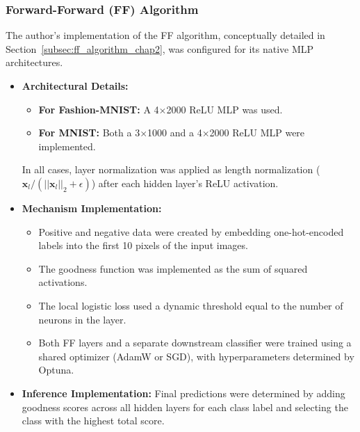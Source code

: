 \subsubsection{Forward-Forward (FF) Algorithm}
\label{subsec:methodology_ff}
The author's implementation of the FF algorithm, conceptually detailed in Section~\ref{subsec:ff_algorithm_chap2}, was configured for its native MLP architectures.
\begin{itemize}
    \item \textbf{Architectural Details:}
        \begin{itemize}
            \item \textbf{For Fashion-MNIST:} A 4$\times$2000 ReLU MLP was used.
            \item \textbf{For MNIST:} Both a 3$\times$1000 and a 4$\times$2000 ReLU MLP were implemented.
        \end{itemize}
        In all cases, layer normalization was applied as length normalization ($ \mathbf{x}_l / (||\mathbf{x}_l||_2 + \epsilon) $) after each hidden layer's ReLU activation.
    \item \textbf{Mechanism Implementation:}
        \begin{itemize}
            \item Positive and negative data were created by embedding one-hot-encoded labels into the first 10 pixels of the input images.
            \item The goodness function was implemented as the sum of squared activations.
            \item The local logistic loss used a dynamic threshold equal to the number of neurons in the layer.
            \item Both FF layers and a separate downstream classifier were trained using a shared optimizer (AdamW or SGD), with hyperparameters determined by Optuna.
        \end{itemize}
    \item \textbf{Inference Implementation:} Final predictions were determined by adding goodness scores across all hidden layers for each class label and selecting the class with the highest total score.
\end{itemize}


